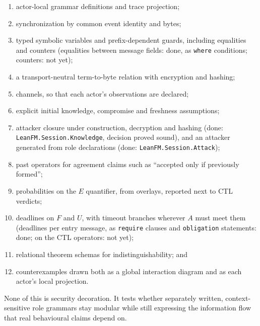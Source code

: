 \begin{enumerate}
  \item actor-local grammar definitions and trace projection;
  \item synchronization by common event identity and bytes;
  \item typed symbolic variables and prefix-dependent guards, including
        equalities and counters (equalities between message fields: done, as
        \texttt{where} conditions; counters: not yet);
  \item a transport-neutral term-to-byte relation with encryption and hashing;
  \item channels, so that each actor's observations are declared;
  \item explicit initial knowledge, compromise and freshness assumptions;
  \item attacker closure under construction, decryption and hashing (done:
        \texttt{LeanFM.Session.Knowledge}, decision proved sound), and an
        attacker generated from role declarations (done:
        \texttt{LeanFM.Session.Attack});
  \item past operators for agreement claims such as
        ``accepted only if previously formed'';
  \item probabilities on the $E$ quantifier, from overlays, reported next to
        CTL verdicts;
  \item deadlines on $F$ and $U$, with timeout branches wherever $A$ must
        meet them (deadlines per entry message, as \texttt{require} clauses and
        \texttt{obligation} statements: done; on the CTL operators: not yet);
  \item relational theorem schemas for indistinguishability; and
  \item counterexamples drawn both as a global interaction diagram and as each
        actor's local projection.
\end{enumerate}

None of this is security decoration. It tests whether separately written,
context-sensitive role grammars stay modular while still expressing the
information flow that real behavioural claims depend on.
